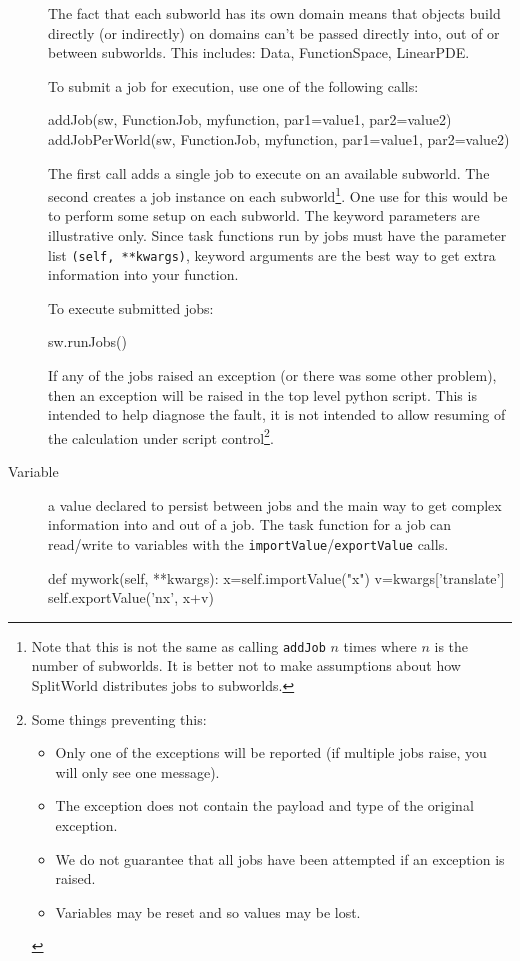 \begin{description}
The fact that each subworld has its own domain means that objects build directly (or indirectly) on domains 
can't be passed directly into, out of or between subworlds.
This includes: Data, FunctionSpace, LinearPDE.

To submit a job for execution, use one of the following calls:

\begin{python}
addJob(sw, FunctionJob, myfunction, par1=value1, par2=value2)  
addJobPerWorld(sw, FunctionJob, myfunction, par1=value1, par2=value2)   
\end{python}

The first call adds a single job to execute on an available subworld.
The second creates a job instance on each subworld\footnote{
Note that this is not the same as calling \texttt{addJob} $n$ times where $n$ is the number of subworlds.
It is better not to make assumptions about how SplitWorld distributes jobs to subworlds.
}.
One use for this would be to perform some setup on each subworld. 
The keyword parameters are illustrative only.
Since task functions run by jobs must have the parameter list \texttt{(self, **kwargs)}, keyword arguments are the best way
to get extra information into your function.

To execute submitted jobs:
\begin{python}
sw.runJobs() 
\end{python}

If any of the jobs raised an exception (or there was some other problem), then an exception will be raised in the 
top level python script.
This is intended to help diagnose the fault, it is not intended to allow resuming of the calculation under script control\footnote{
Some things preventing this:
\begin{itemize}
 \item Only one of the exceptions will be reported (if multiple jobs raise, you will only see one message).
 \item The exception does not contain the payload and type of the original exception.
 \item We do not guarantee that all jobs have been attempted if an exception is raised.
 \item Variables may be reset and so values may be lost.
\end{itemize}
}.





\item[Variable] a value declared to persist between jobs and the main way to get complex information into and out of a job.
The task function for a job can read/write to variables with the \texttt{importValue}/\texttt{exportValue} calls.
\begin{python}
def mywork(self, **kwargs):
   x=self.importValue("x")
   v=kwargs['translate']
   self.exportValue('nx', x+v)
\end{python}


\end{description}
